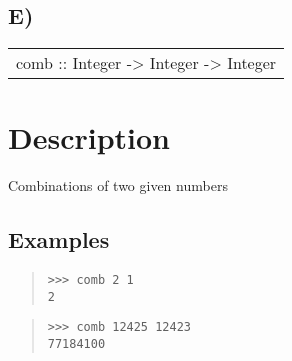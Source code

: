 \subsection{E)}
\begin{haddockdesc}
\item[\begin{tabular}{@{}l}
comb :: Integer -> Integer -> Integer
\end{tabular}]
{\haddockbegindoc
\section*{Description}
Combinations of two given numbers\par
\subsection*{Examples}
\begin{quote}
{\haddockverb\begin{verbatim}
>>> comb 2 1
2

\end{verbatim}}
\end{quote}
\begin{quote}
{\haddockverb\begin{verbatim}
>>> comb 12425 12423
77184100

\end{verbatim}}
\end{quote}}
\end{haddockdesc}

